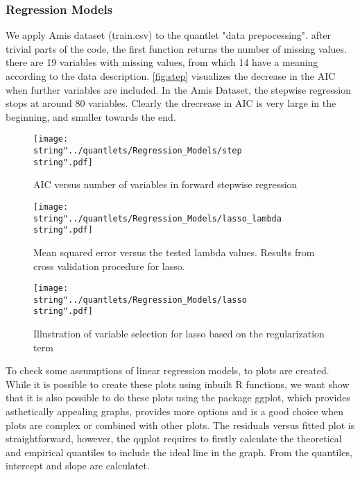 
\subsubsection{Regression Models}
We apply Amis dataset (train.csv) to the quantlet "data prepocessing".
after trivial parts of the code, the first function returns the number of missing values.  there are 19 variables with missing values, from which 14 have a meaning according to the data description. 
\autoref{fig:step} visualizes the decrease in the AIC when further variables are included. In the Amis Dataset, the stepwise regression stops at around 80 variables. Clearly the drecrease in AIC is very large in the beginning, and smaller towards the end. 



\begin{figure}
  \centering
\texttt{[image: \\string"../quantlets/Regression\_Models/step\\string".pdf]}
  \caption{AIC versus number of variables in forward stepwise regression}\label{fig:step}
\end{figure}


\begin{figure}
  \centering
\texttt{[image: \\string"../quantlets/Regression\_Models/lasso\_lambda\\string".pdf]}
  \caption{Mean squared error versus the tested lambda values. Results from cross validation procedure for lasso.}\label{fig:step}
\end{figure}


\begin{figure}
  \centering
\texttt{[image: \\string"../quantlets/Regression\_Models/lasso\\string".pdf]}
  \caption{Illustration of variable selection for lasso based on the regularization term}\label{fig:step}
\end{figure}






To check some assumptions of linear regression models, to plots are
created. While it is possible to create these plots using inbuilt
R functions, we want show that it is also possible to do these plots
using the package ggplot, which provides asthetically appealing graphs,
provides more options and is a good choice when plots are complex
or combined with other plots. The residuals versus fitted plot is
straightforward, however, the qqplot requires to firstly calculate
the theoretical and empirical quantiles to include the ideal line
in the graph. From the quantiles, intercept and slope are calculatet. 
